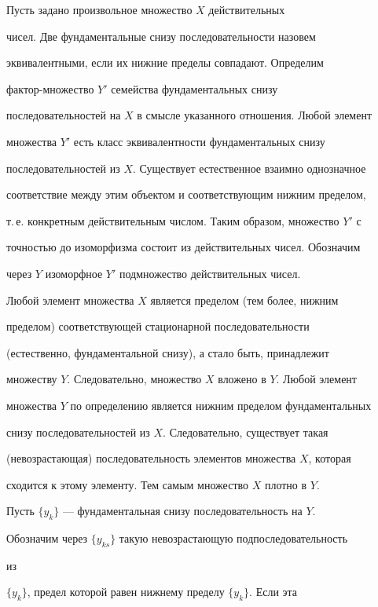 \begin{pf} 


Пусть задано произвольное множество $X$ действительных 


чисел. Две фундаментальные снизу последовательности назовем 


эквивалентными, если их нижние пределы совпадают. Определим 


фактор-множество $Y'$ семейства фундаментальных снизу 


последовательностей на $X$ в смысле указанного отношения. Любой элемент 


множества $Y'$ есть класс эквивалентности фундаментальных снизу 


последовательностей из $X$. Существует естественное взаимно однозначное 


соответствие между этим объектом и соответствующим нижним пределом, 


т.\,е. конкретным действительным числом. Таким образом, множество $Y'$ с 


точностью до изоморфизма состоит из действительных чисел. Обозначим 


через $Y$ изоморфное $Y'$ подмножество действительных чисел. 


 


Любой элемент множества $X$ является пределом (тем более, нижним 


пределом) соответствующей стационарной последовательности 


(естественно, фундаментальной снизу), а стало быть, принадлежит 


множеству $Y$. Следовательно, множество $X$ вложено в $Y$. Любой элемент 


множества $Y$ по определению является нижним пределом фундаментальных 


снизу последовательностей из $X$. Следовательно, существует такая 


(невозрастающая) последовательность элементов множества $X$, которая 


сходится к этому элементу. Тем самым множество $X$ плотно в $Y$. 


 


Пусть $\{y_k\}$ --- фундаментальная снизу последовательность на $Y$. 


Обозначим через $\{y_{ks}\}$ такую невозрастающую подпоследовательность 


из 


$\{y_k\}$, предел которой равен нижнему пределу $\{y_k\}$. Если эта 



\end{pf}

